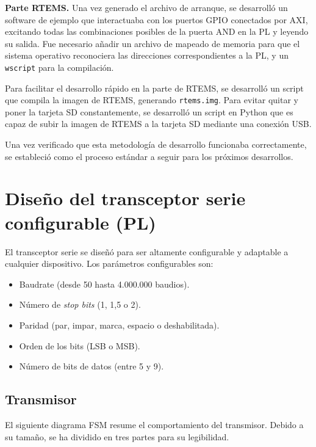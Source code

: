 \textbf{Parte RTEMS.} Una vez generado el archivo de arranque, se desarrolló un software de
ejemplo que interactuaba con los puertos GPIO conectados por AXI, excitando todas las
combinaciones posibles de la puerta AND en la PL y leyendo su salida. Fue necesario añadir
un archivo de mapeado de memoria para que el sistema operativo reconociera las direcciones
correspondientes a la PL, y un \texttt{wscript} para la compilación.

Para facilitar el desarrollo rápido en la parte de RTEMS, se desarrolló un script que compila
la imagen de RTEMS, generando \texttt{rtems.img}. Para evitar quitar y poner la tarjeta SD
constantemente, se desarrolló un script en Python que es capaz de subir la imagen de RTEMS
a la tarjeta SD mediante una conexión USB.

Una vez verificado que esta metodología de desarrollo funcionaba correctamente, se
estableció como el proceso estándar a seguir para los próximos desarrollos.

\section{Diseño del transceptor serie configurable (PL)}

El transceptor serie se diseñó para ser altamente configurable y adaptable a cualquier
dispositivo. Los parámetros configurables son:

\begin{itemize}
    \item Baudrate (desde 50 hasta 4.000.000 baudios).
    \item Número de \textit{stop bits} (1, 1,5 o 2).
    \item Paridad (par, impar, marca, espacio o deshabilitada).
    \item Orden de los bits (LSB o MSB).
    \item Número de bits de datos (entre 5 y 9).
\end{itemize}

\subsection{Transmisor}

El siguiente diagrama FSM resume el comportamiento del transmisor. Debido a su tamaño, se
ha dividido en tres partes para su legibilidad.

